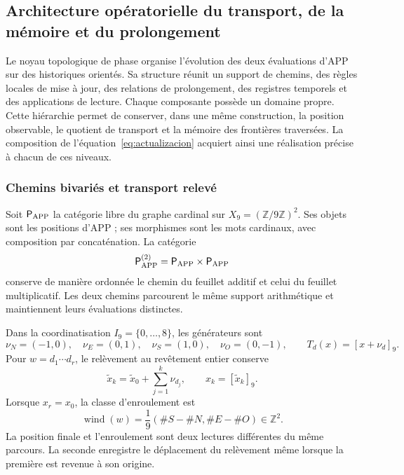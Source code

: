 \subsection{Architecture opératorielle du transport, de la mémoire et du prolongement}
\label{ii:tpk-arquitectura}

Le noyau topologique de phase organise l'évolution des deux évaluations d'APP sur des historiques orientés. Sa structure réunit un support de chemins, des règles locales de mise à jour, des relations de prolongement, des registres temporels et des applications de lecture. Chaque composante possède un domaine propre. Cette hiérarchie permet de conserver, dans une même construction, la position observable, le quotient de transport et la mémoire des frontières traversées. La composition de l'équation~\eqref{eq:actualizacion} acquiert ainsi une réalisation précise à chacun de ces niveaux.

\subsubsection{Chemins bivariés et transport relevé}

Soit \(\mathsf P_{\rm APP}\) la catégorie libre du graphe cardinal sur \(X_9=(\mathbb Z/9\mathbb Z)^2\). Ses objets sont les positions d'APP ; ses morphismes sont les mots cardinaux, avec composition par concaténation. La catégorie
\[
 \mathsf P_{\rm APP}^{(2)}
 =\mathsf P_{\rm APP}\times\mathsf P_{\rm APP}
\]
conserve de manière ordonnée le chemin du feuillet additif et celui du feuillet multiplicatif. Les deux chemins parcourent le même support arithmétique et maintiennent leurs évaluations distinctes.

Dans la coordinatisation \(I_9=\{0,\ldots,8\}\), les générateurs sont
\[
 \nu_N=(-1,0),\quad\nu_E=(0,1),\quad
 \nu_S=(1,0),\quad\nu_O=(0,-1),
 \qquad T_d(x)=[x+\nu_d]_9.
\]
Pour \(w=d_1\cdots d_r\), le relèvement au revêtement entier conserve
\[
 \widetilde x_k=\widetilde x_0+\sum_{j=1}^{k}\nu_{d_j},
 \qquad x_k=[\widetilde x_k]_9.
\]
Lorsque \(x_r=x_0\), la classe d'enroulement est
\begin{equation}
 \operatorname{wind}(w)
 =\frac{1}{9}(\#S-\#N,\#E-\#O)\in\mathbb Z^2.
 \label{ii:tpk-enrollamiento}
\end{equation}
La position finale et l'enroulement sont deux lectures différentes du même parcours. La seconde enregistre le déplacement du relèvement même lorsque la première est revenue à son origine.

